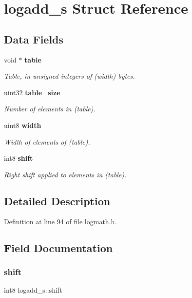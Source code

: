 \section{logadd\+\_\+s Struct Reference}
\label{structlogadd__s}
\subsection*{Data Fields}
\begin{DoxyCompactItemize}
\item 
void $\ast$ \textbf{ table}
\begin{DoxyCompactList}\small\item\em Table, in unsigned integers of (width) bytes. \end{DoxyCompactList}\item 
uint32 \textbf{ table\+\_\+size}
\begin{DoxyCompactList}\small\item\em Number of elements in (table). \end{DoxyCompactList}\item 
uint8 \textbf{ width}
\begin{DoxyCompactList}\small\item\em Width of elements of (table). \end{DoxyCompactList}\item 
int8 \textbf{ shift}
\begin{DoxyCompactList}\small\item\em Right shift applied to elements in (table). \end{DoxyCompactList}\end{DoxyCompactItemize}


\subsection{Detailed Description}


Definition at line 94 of file logmath.\+h.



\subsection{Field Documentation}
\mbox{\label{structlogadd__s_a4000a49e71ed2c09da4f34cb5ccaed4b}} 
\subsubsection{shift}
{\footnotesize\ttfamily int8 logadd\+\_\+s\+::shift}



